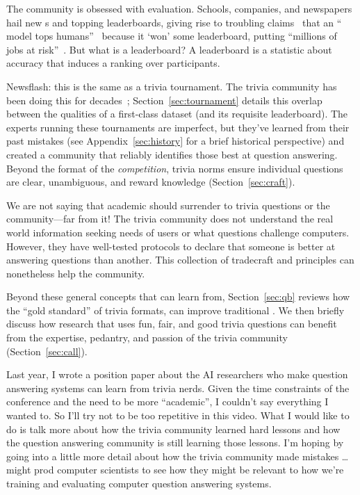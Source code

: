 
The \qa{} community is obsessed with evaluation.
Schools, companies, and newspapers hail new s and topping
leaderboards, giving rise to troubling claims~\citep{lipton-19} that an
`` model tops humans''~\citep{najberg-18} because it `won'
some leaderboard, putting ``millions of jobs at
risk''~\citep{cuthbertson-18}.
But what is a leaderboard? 
A leaderboard is a statistic about \qa{} accuracy that induces a ranking over participants.

Newsflash: this is the same as a trivia tournament. The trivia community has been doing this for decades~\citep{jennings-06}; 
Section~\ref{sec:tournament} details this
overlap between the qualities of a first-class  dataset (and
its requisite leaderboard).
The experts running these tournaments are imperfect, but they've learned from their past mistakes (see Appendix~\ref{sec:history} for a brief historical perspective) and created a community that reliably identifies those best at question answering.
Beyond the format of the \emph{competition}, trivia norms ensure individual questions are clear, unambiguous,
and reward knowledge (Section~\ref{sec:craft}).

We are not saying that academic  should surrender to trivia questions or the community---far from it!
The trivia community does not understand the real world information seeking needs of users or what questions challenge computers.
However, they have well-tested protocols to declare that someone is better at answering questions than another.
This collection of tradecraft and principles can nonetheless help the  community.

Beyond these general concepts that  can learn from,
Section~\ref{sec:qb} reviews how the ``gold standard'' of trivia
formats, \qb{} can improve traditional .
We then briefly discuss how research that uses fun, fair, and good
trivia questions can benefit from the expertise, pedantry, and passion
of the trivia community (Section~\ref{sec:call}).


Last year, I wrote a position paper about the AI researchers who make question answering systems can learn from trivia nerds.  Given the time constraints of the conference and the need to be more “academic”, I couldn’t say everything I wanted to.  So I’ll try not to be too repetitive in this video.  What I would like to do is talk more about how the trivia community learned hard lessons and how the question answering community is still learning those lessons.  I’m hoping by going into a little more detail about how the trivia community made mistakes … might prod computer scientists to see how they might be relevant to how we’re training and evaluating computer question answering systems.

